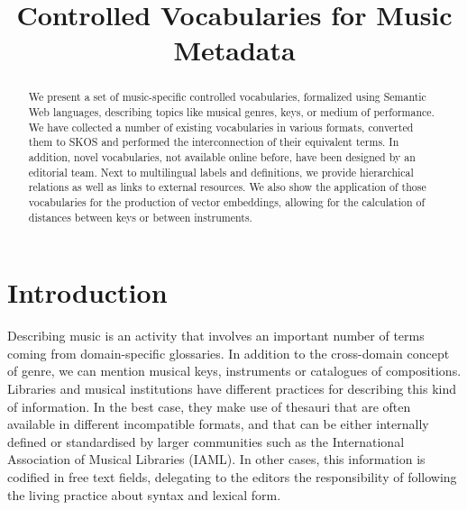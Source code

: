 \documentclass{article}
\title{Controlled Vocabularies for Music Metadata}
\begin{document}
\maketitle

\begin{abstract}
We present a set of music-specific controlled vocabularies, formalized using Semantic Web languages, describing topics like musical genres, keys, or medium of performance. We have collected a number of existing vocabularies in various formats, converted them to SKOS and performed the interconnection of their equivalent terms. In addition, novel vocabularies, not available online before, have been designed by an editorial team. Next to multilingual labels and definitions, we provide hierarchical relations as well as links to external resources. We also show the application of those vocabularies for the production of vector embeddings, allowing for the calculation of distances between keys or between instruments.
\end{abstract}

\section{Introduction}\label{sec:introduction}
Describing music is an activity that involves an important number of terms coming from domain-specific glossaries. In addition to the cross-domain concept of genre, we can mention musical keys, instruments or catalogues of compositions. Libraries and musical institutions have different practices for describing this kind of information. In the best case, they make use of thesauri that are often available in different incompatible formats, and that can be either internally defined or standardised by larger communities such as the International Association of Musical Libraries (IAML). In other cases, this information is codified in free text fields, delegating to the editors the responsibility of following the living practice about syntax and lexical form.
\end{document}
